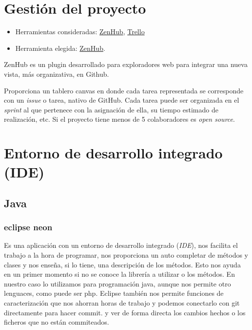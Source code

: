 \section{Gestión del proyecto}\label{gestion-del-proyecto}

\begin{itemize}
	\tightlist
	\item
	Herramientas consideradas: \href{https://www.zenhub.com/}{ZenHub},
	\href{https://trello.com/}{Trello}
	\item
	Herramienta elegida: \href{https://www.zenhub.com/}{ZenHub}.
\end{itemize}

ZenHub es un plugin desarrollado para exploradores web para integrar una nueva vista, más organizativa, en Github. 

Proporciona un tablero canvas en donde cada tarea representada se corresponde con un \emph{issue} o tarea, nativo de GitHub. Cada tarea puede ser organizada en el \emph{sprint} al que pertenece con la asignación de ella, su tiempo estimado de realización, etc. Si el proyecto tiene menos de 5 colaboradores es \emph{open source}. \cite{web:zenhub}


\section{Entorno de desarrollo integrado
	(IDE)}\label{entorno-de-desarrollo-integrado-ide}

\subsection{Java}\label{java}

\subsubsection{eclipse neon}\label{eclipse}
Es una aplicación con un entorno de desarrollo integrado (\emph{IDE}), nos facilita el trabajo a la hora de programar, nos proporciona un auto completar de métodos y clases y nos enseña, si lo tiene, una descripción de los métodos. Esto nos ayuda en un primer momento si no se conoce la librería a utilizar o los métodos. En nuestro caso lo utilizamos para programación java, aunque nos permite otro lenguaces, como puede ser php.
Eclipse también nos permite funciones de caracterización que nos ahorran horas de trabajo y podemos conectarlo con git directamente para hacer commit. y ver de forma directa los cambios hechos o los ficheros que no están commiteados.\cite{web:eclipse}

